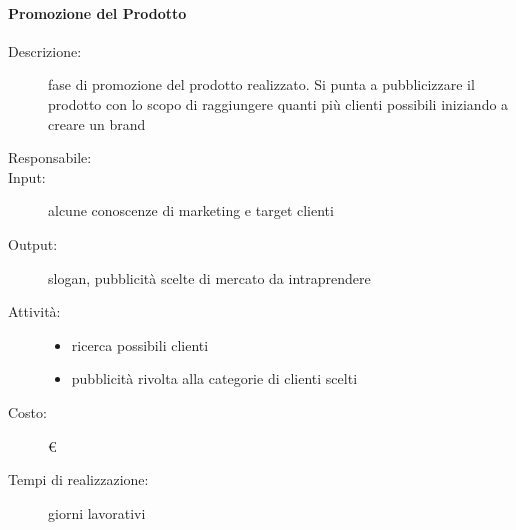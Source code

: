 \paragraph{Promozione del Prodotto}
\begin{description}
\item[Descrizione:] fase di promozione del prodotto realizzato. Si punta a pubblicizzare il
prodotto con lo scopo di raggiungere quanti più clienti possibili iniziando a creare un brand 

\item[Responsabile:] 

\item[Input:] alcune conoscenze di marketing e target clienti 

\item[Output:] slogan, pubblicità scelte di mercato da intraprendere 

\item[Attività:]
\begin{itemize}
\item ricerca possibili clienti
\item pubblicità rivolta alla categorie di clienti scelti
\end{itemize}
\item[Costo:] \euro 
\item[Tempi di realizzazione:]  giorni lavorativi
\end{description}
